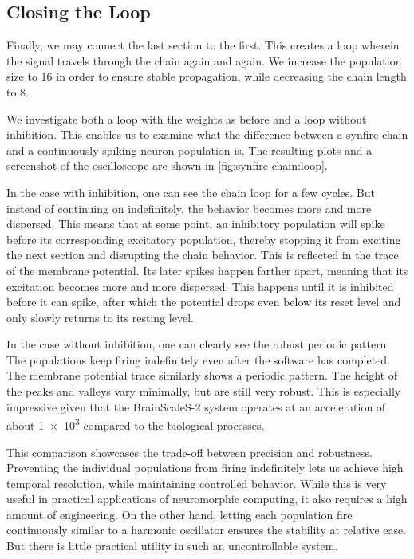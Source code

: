 \subsection{Closing the Loop}
Finally, we may connect the last section to the first.
This creates a loop wherein the signal travels through the chain again and again.
We increase the population size to 16 in order to ensure stable propagation, while decreasing the chain length to 8.

We investigate both a loop with the weights as before and a loop without inhibition.
This enables us to examine what the difference between a synfire chain and a continuously spiking neuron population is.
The resulting plots and a screenshot of the oscilloscope are shown in \autoref{fig:synfire-chain:loop}.

In the case with inhibition, one can see the chain loop for a few cycles.
But instead of continuing on indefinitely, the behavior becomes more and more dispersed.
This means that at some point, an inhibitory population will spike before its corresponding excitatory population, thereby stopping it from exciting the next section and disrupting the chain behavior.
This is reflected in the trace of the membrane potential.
Its later spikes happen farther apart, meaning that its excitation becomes more and more dispersed.
This happens until it is inhibited before it can spike, after which the potential drops even below its reset level and only slowly returns to its resting level. 

In the case without inhibition, one can clearly see the robust periodic pattern.
The populations keep firing indefinitely even after the software has completed.
The membrane potential trace similarly shows a periodic pattern.
The height of the peaks and valleys vary minimally, but are still very robust.
This is especially impressive given that the BrainScaleS-2 system operates at an acceleration of about \num{1e3} compared to the biological processes.

This comparison showcases the trade-off between precision and robustness.
Preventing the individual populations from firing indefinitely lets us achieve high temporal resolution, while maintaining controlled behavior.
While this is very useful in practical applications of neuromorphic computing, it also requires a high amount of engineering.
On the other hand, letting each population fire continuously similar to a harmonic oscillator ensures the stability at relative ease.
But there is little practical utility in such an uncontrollable system.

